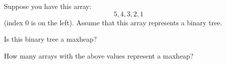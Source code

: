 Suppose you have this array:
\[
5, 4, 3, 2, 1
\]
(index 0 is on the left).
Assume that this array represents a binary tree.
\begin{tightlist}
  \item Is this binary tree a maxheap?
  \item How many arrays with the above values represent a maxheap?
\end{tightlist}
